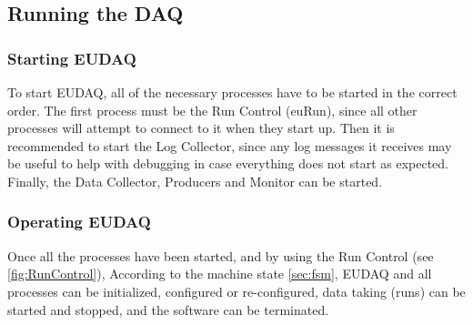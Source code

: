 \subsection{Running the DAQ}

\subsubsection{Starting EUDAQ}\label{sec:STARTRUN}
To start EUDAQ, all of the necessary processes have to be started in the correct order.
The first process must be the Run Control (euRun),
since all other processes will attempt to connect to it when they start up.
Then it is recommended to start the Log Collector,
since any log messages it receives may be useful
to help with debugging in case everything does not start as expected.
Finally, the Data Collector, Producers and Monitor can be started.

\subsubsection{Operating EUDAQ}
Once all the processes have been started, 
and by using the Run Control (see \autoref{fig:RunControl}),
According to the machine state \autoref{sec:fsm}, EUDAQ and all processes can be initialized, configured or re-configured, data taking (runs) can be started and stopped, and the software can be terminated.

